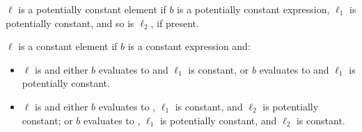 \documentclass[makeidx]{article}
\begin{document}
{\begin{itemize}
  $\ell$ is a potentially constant element
  if $b$ is a potentially constant expression,
  $\ell_1$ is potentially constant,
  and so is $\ell_2$, if present.

  $\ell$ is a constant element if $b$ is a constant expression
  and:

  \begin{itemize}
  \item
    $\ell$ is  and
    either $b$ evaluates to \TRUE{} and $\ell_1$ is constant,
    or $b$ evaluates to \FALSE{} and $\ell_1$ is potentially constant.
  \item
    $\ell$ is  and
    either $b$ evaluates to \TRUE,
    $\ell_1$ is constant,
    and $\ell_2$ is potentially constant;
    or $b$ evaluates to \FALSE,
    $\ell_1$ is potentially constant,
    and $\ell_2$ is constant.
  \end{itemize}
\end{itemize}


}
\end{document}
